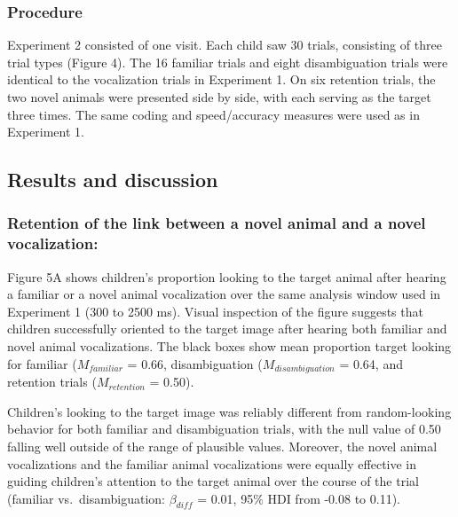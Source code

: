 \documentclass[english,floatsintext,man]{apa6}
\theoremstyle{definition}
\theoremstyle{definition}
\theoremstyle{definition}
\theoremstyle{remark}
\begin{document}
\hypertarget{procedure-1}{%
\subsubsection{Procedure}\label{procedure-1}}

Experiment 2 consisted of one visit. Each child saw 30 trials,
consisting of three trial types (Figure 4). The 16 familiar trials and
eight disambiguation trials were identical to the vocalization trials in
Experiment 1. On six retention trials, the two novel animals were
presented side by side, with each serving as the target three times. The
same coding and speed/accuracy measures were used as in Experiment 1.

\hypertarget{results-and-discussion-1}{%
\subsection{Results and discussion}\label{results-and-discussion-1}}

\hypertarget{retention-of-the-link-between-a-novel-animal-and-a-novel-vocalization}{%
\subsubsection{Retention of the link between a novel animal and a novel
vocalization:}\label{retention-of-the-link-between-a-novel-animal-and-a-novel-vocalization}}

Figure 5A shows children's proportion looking to the target animal after
hearing a familiar or a novel animal vocalization over the same analysis
window used in Experiment 1 (300 to 2500 ms). Visual inspection of the
figure suggests that children successfully oriented to the target image
after hearing both familiar and novel animal vocalizations. The black
boxes show mean proportion target looking for familiar (\(M_{familiar}\)
= 0.66, disambiguation (\(M_{disambiguation}\) = 0.64, and retention
trials (\(M_{retention}\) = 0.50).

Children's looking to the target image was reliably different from
random-looking behavior for both familiar and disambiguation trials,
with the null value of 0.50 falling well outside of the range of
plausible values. Moreover, the novel animal vocalizations and the
familiar animal vocalizations were equally effective in guiding
children's attention to the target animal over the course of the trial
(familiar vs.~disambiguation: \(\beta_{diff}\) = 0.01, 95\% HDI from
-0.08 to 0.11).
\end{document}
